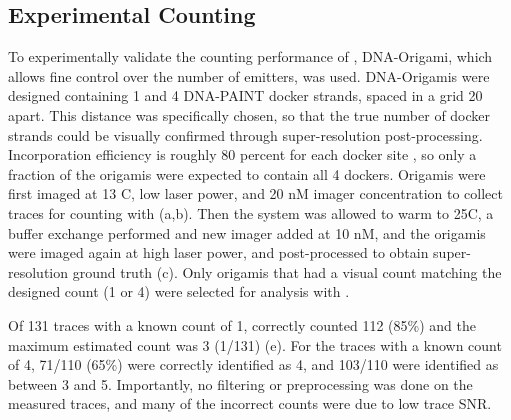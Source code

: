 \subsection{Experimental Counting}
To experimentally validate the counting performance of \ours, DNA-Origami, which allows fine control over the number of emitters, was used.
	DNA-Origamis were designed containing 1 and 4 DNA-PAINT docker strands, spaced in a grid 20 \nanometer apart. 
	This distance was specifically chosen, so that the true number of docker strands could be visually confirmed through super-resolution post-processing.
	Incorporation efficiency is roughly 80 percent for each docker site \cite{strauss_2018}, so only a fraction of the origamis were expected to contain all 4 dockers. 
	Origamis were first imaged at 13 C, low laser power, and 20 nM imager concentration to collect traces for counting with \ours (a,b).
	Then the system was allowed to warm to 25C, a buffer exchange performed and new imager added at 10 nM, and the origamis were imaged again at high laser power,
	and post-processed to obtain super-resolution ground truth (c).
	Only origamis that had a visual count matching the designed count (1 or 4) were selected for analysis with \ours.

Of 131 traces with a known count of 1, \ours correctly counted 112 (85\%) and the maximum estimated count was 3 (1/131) (e).
	For the traces with a known count of 4, 71/110 (65\%) were correctly identified as 4, and 103/110 were identified as between 3 and 5.
	Importantly, no filtering or preprocessing was done on the measured traces, and many of the incorrect counts were due to low trace SNR. %
